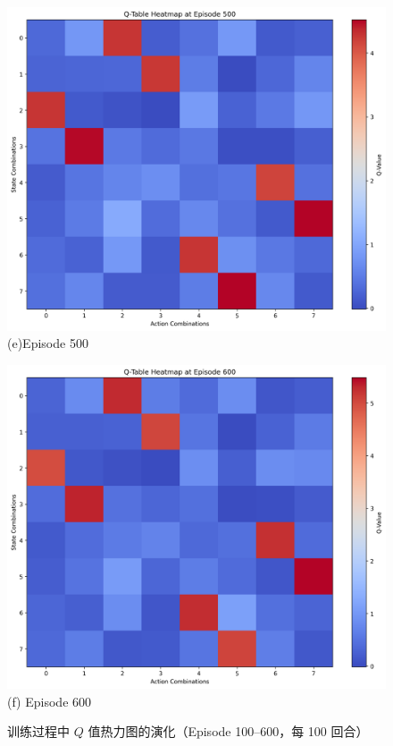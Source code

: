 \begin{figure}[htbp]
    \vspace{0.5em}
    \begin{minipage}{0.45\textwidth}
        \includegraphics[width=\linewidth]{figure/multi_switch/q_heatmap_episode_500.png}
        \centering (e)Episode 500
    \end{minipage}
    \hfill
    \begin{minipage}{0.45\textwidth}
        \includegraphics[width=\linewidth]{figure/multi_switch/q_heatmap_episode_600.png}
        \centering (f) Episode 600
    \end{minipage}

    \caption{训练过程中 \(Q\) 值热力图的演化（Episode 100–600，每 100 回合）}
    \label{fig:qvalue_snapshots}
\end{figure}

